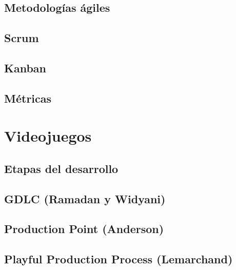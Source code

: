 \documentclass[12pt]{report}
\begin{document}
\section{Metodologías ágiles}


\section{Scrum}


\section{Kanban}


\section{Métricas}

% 
%
\chapter{Videojuegos}


\section{Etapas del desarrollo}


\section{GDLC (Ramadan y Widyani)}


\section{Production Point (Anderson)}


\section{Playful Production Process (Lemarchand)}

% 
%
\printbibliography
\end{document}
